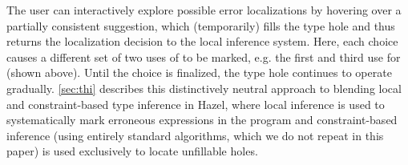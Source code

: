 The user can interactively explore possible error localizations by hovering over a partially consistent suggestion, which (temporarily) fills the type hole and thus returns the localization decision to the local inference system.
Here, each choice causes a different set of two uses of  to be marked, e.g. the first and third use for  (shown above). Until the choice is finalized, the type hole continues to operate gradually.
\cref{sec:thi} describes this distinctively neutral approach to blending local and constraint-based type inference in Hazel, where local inference is used to systematically mark erroneous expressions in the program and constraint-based inference (using entirely standard algorithms, which we do not repeat in this paper) is used exclusively to locate unfillable holes.
